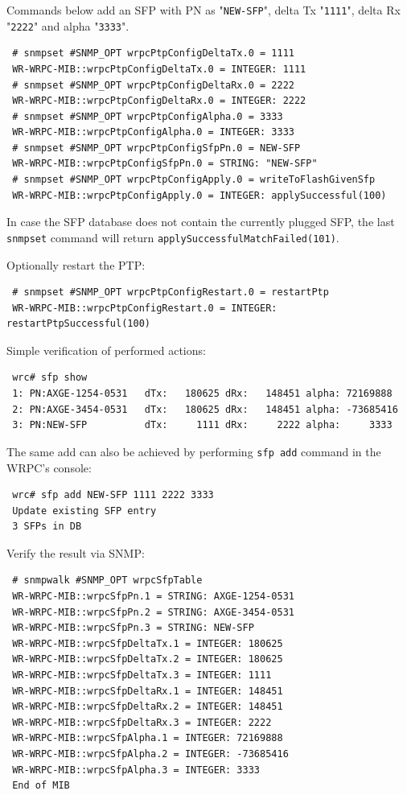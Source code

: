 \documentclass[a4paper, 12pt]{article}
\newcommand{\codeHook}[1]{\mbox{\ttfamily\MakeTextUppercase{#1}}}
\begin{document}
Commands below add an SFP with PN as "\texttt{NEW-SFP}", delta Tx "\texttt{1111}",
delta Rx "\texttt{2222}" and alpha "\texttt{3333}".
\begin{lstlisting}
 # snmpset #SNMP_OPT wrpcPtpConfigDeltaTx.0 = 1111
 WR-WRPC-MIB::wrpcPtpConfigDeltaTx.0 = INTEGER: 1111
 # snmpset #SNMP_OPT wrpcPtpConfigDeltaRx.0 = 2222
 WR-WRPC-MIB::wrpcPtpConfigDeltaRx.0 = INTEGER: 2222
 # snmpset #SNMP_OPT wrpcPtpConfigAlpha.0 = 3333
 WR-WRPC-MIB::wrpcPtpConfigAlpha.0 = INTEGER: 3333
 # snmpset #SNMP_OPT wrpcPtpConfigSfpPn.0 = NEW-SFP
 WR-WRPC-MIB::wrpcPtpConfigSfpPn.0 = STRING: "NEW-SFP"
 # snmpset #SNMP_OPT wrpcPtpConfigApply.0 = writeToFlashGivenSfp
 WR-WRPC-MIB::wrpcPtpConfigApply.0 = INTEGER: applySuccessful(100)
\end{lstlisting}

In case the SFP database does not contain the currently plugged SFP, the last
\texttt{snmpset} command will return \texttt{applySuccessfulMatchFailed(101)}.

Optionally restart the PTP:
\begin{lstlisting}
 # snmpset #SNMP_OPT wrpcPtpConfigRestart.0 = restartPtp
 WR-WRPC-MIB::wrpcPtpConfigRestart.0 = INTEGER: restartPtpSuccessful(100)
\end{lstlisting}

Simple verification of performed actions:
\begin{lstlisting}
 wrc# sfp show
 1: PN:AXGE-1254-0531   dTx:   180625 dRx:   148451 alpha: 72169888
 2: PN:AXGE-3454-0531   dTx:   180625 dRx:   148451 alpha: -73685416
 3: PN:NEW-SFP          dTx:     1111 dRx:     2222 alpha:     3333
\end{lstlisting}

The same add can also be achieved by performing \texttt{sfp add} command in
the \codeHook{wrpc}'s console:
\begin{lstlisting}
 wrc# sfp add NEW-SFP 1111 2222 3333
 Update existing SFP entry
 3 SFPs in DB
\end{lstlisting}

Verify the result via SNMP:
\begin{lstlisting}
 # snmpwalk #SNMP_OPT wrpcSfpTable
 WR-WRPC-MIB::wrpcSfpPn.1 = STRING: AXGE-1254-0531
 WR-WRPC-MIB::wrpcSfpPn.2 = STRING: AXGE-3454-0531
 WR-WRPC-MIB::wrpcSfpPn.3 = STRING: NEW-SFP
 WR-WRPC-MIB::wrpcSfpDeltaTx.1 = INTEGER: 180625
 WR-WRPC-MIB::wrpcSfpDeltaTx.2 = INTEGER: 180625
 WR-WRPC-MIB::wrpcSfpDeltaTx.3 = INTEGER: 1111
 WR-WRPC-MIB::wrpcSfpDeltaRx.1 = INTEGER: 148451
 WR-WRPC-MIB::wrpcSfpDeltaRx.2 = INTEGER: 148451
 WR-WRPC-MIB::wrpcSfpDeltaRx.3 = INTEGER: 2222
 WR-WRPC-MIB::wrpcSfpAlpha.1 = INTEGER: 72169888
 WR-WRPC-MIB::wrpcSfpAlpha.2 = INTEGER: -73685416
 WR-WRPC-MIB::wrpcSfpAlpha.3 = INTEGER: 3333
 End of MIB
\end{lstlisting}
\end{document}
